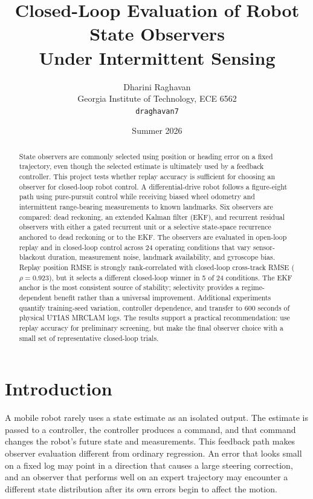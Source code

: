 \documentclass[11pt]{article}
\title{\vspace{-1.2em}\textbf{Closed-Loop Evaluation of Robot State Observers\\Under Intermittent Sensing}}
\author{Dharini Raghavan\\\small Georgia Institute of Technology, ECE 6562\\\small \texttt{draghavan7}}
\date{Summer 2026}
\begin{document}
\maketitle
\vspace{-1.2em}

\begin{abstract}
State observers are commonly selected using position or heading error on a fixed trajectory, even though the selected estimate is ultimately used by a feedback controller. This project tests whether replay accuracy is sufficient for choosing an observer for closed-loop robot control. A differential-drive robot follows a figure-eight path using pure-pursuit control while receiving biased wheel odometry and intermittent range-bearing measurements to known landmarks. Six observers are compared: dead reckoning, an extended Kalman filter (EKF), and recurrent residual observers with either a gated recurrent unit or a selective state-space recurrence anchored to dead reckoning or to the EKF. The observers are evaluated in open-loop replay and in closed-loop control across 24 operating conditions that vary sensor-blackout duration, measurement noise, landmark availability, and gyroscope bias. Replay position RMSE is strongly rank-correlated with closed-loop cross-track RMSE ($\rho=0.923$), but it selects a different closed-loop winner in 5 of 24 conditions. The EKF anchor is the most consistent source of stability; selectivity provides a regime-dependent benefit rather than a universal improvement. Additional experiments quantify training-seed variation, controller dependence, and transfer to 600 seconds of physical UTIAS MRCLAM logs. The results support a practical recommendation: use replay accuracy for preliminary screening, but make the final observer choice with a small set of representative closed-loop trials.
\end{abstract}

\section{Introduction}
A mobile robot rarely uses a state estimate as an isolated output. The estimate is passed to a controller, the controller produces a command, and that command changes the robot's future state and measurements. This feedback path makes observer evaluation different from ordinary regression. An error that looks small on a fixed log may point in a direction that causes a large steering correction, and an observer that performs well on an expert trajectory may encounter a different state distribution after its own errors begin to affect the motion.
\end{document}
